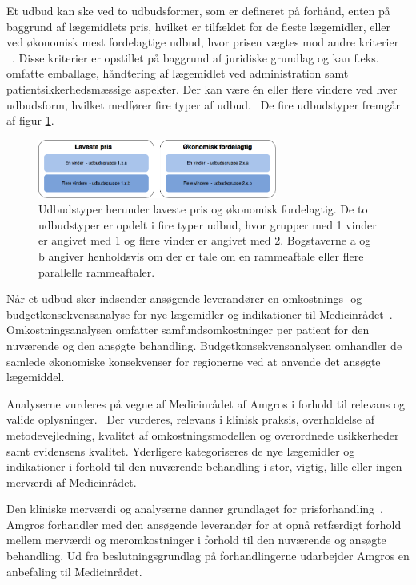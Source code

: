 Et udbud kan ske ved to udbudsformer, som er defineret på forhånd, enten på baggrund af lægemidlets pris, hvilket er tilfældet for de fleste lægemidler, eller ved økonomisk mest fordelagtige udbud, hvor prisen vægtes mod andre kriterier ~\citep{Amgros2018a}. Disse kriterier er opstillet på baggrund af juridiske grundlag og kan f.eks. omfatte emballage, håndtering af lægemidlet ved administration samt patientsikkerhedsmæssige aspekter. Der kan være én eller flere vindere ved hver udbudsform, hvilket medfører fire typer af udbud.~\citep{Amgros2018a} De fire udbudstyper fremgår af figur \ref{fig:TypeUdbud}.

\begin{figure}[H]\centering
	\includegraphics[width=0.7\textwidth]{billeder/TypeUdbud.png} 
	\caption{Udbudstyper herunder laveste pris og økonomisk fordelagtig. De to udbudstyper er opdelt i fire typer udbud, hvor grupper med 1 vinder er angivet med 1 og flere vinder er angivet med 2. Bogstaverne a og b angiver henholdsvis om der er tale om en rammeaftale eller flere parallelle rammeaftaler. ~\citep{Amgros2018a}}
	\label{fig:TypeUdbud}  
\end{figure}

Når et udbud sker indsender ansøgende leverandører en omkostnings- og budgetkonsekvensanalyse for nye lægemidler og indikationer til Medicinrådet~\citep{Amgros2017, Amgros2017a}. Omkostningsanalysen omfatter samfundsomkostninger per patient for den nuværende og den ansøgte behandling.
Budgetkonsekvensanalysen omhandler de samlede økonomiske konsekvenser for regionerne ved at anvende det ansøgte lægemiddel.~\citep{Amgros2017a}

Analyserne vurderes på vegne af Medicinrådet af Amgros i forhold til relevans og valide oplysninger.~\citep{Amgros2017, Amgros2017a} Der vurderes, relevans i klinisk praksis, overholdelse af metodevejledning, kvalitet af omkostningsmodellen og overordnede usikkerheder samt evidensens kvalitet. Yderligere kategoriseres de nye lægemidler og indikationer i forhold til den nuværende behandling i stor, vigtig, lille eller ingen merværdi af Medicinrådet.~\citep{Amgros2017, Amgros2017a}

Den kliniske merværdi og analyserne danner grundlaget for prisforhandling~\citep{Amgros2017, Amgros2017a}. Amgros forhandler med den ansøgende leverandør for at opnå retfærdigt forhold mellem merværdi og meromkostninger i forhold til den nuværende og ansøgte behandling. Ud fra beslutningsgrundlag på forhandlingerne udarbejder Amgros en anbefaling til Medicinrådet.~\citep{Amgros2017, Amgros2017a}

